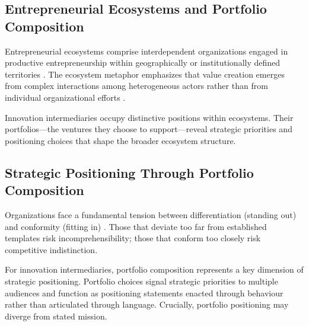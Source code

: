 \documentclass[../main.tex]{subfiles}
\begin{document}
\subsection{Entrepreneurial Ecosystems and Portfolio Composition}

Entrepreneurial ecosystems comprise interdependent organizations engaged in productive entrepreneurship within geographically or institutionally defined territories \cite{cohen2006sustainable,acs2017lineages}. The ecosystem metaphor emphasizes that value creation emerges from complex interactions among heterogeneous actors rather than from individual organizational efforts \cite{adner2017ecosystem}.

Innovation intermediaries occupy distinctive positions within ecosystems. Their portfolios---the ventures they choose to support---reveal strategic priorities and positioning choices that shape the broader ecosystem structure.

\subsection{Strategic Positioning Through Portfolio Composition}

Organizations face a fundamental tension between differentiation (standing out) and conformity (fitting in) \cite{porter1980competitive,deephouse1999same}. Those that deviate too far from established templates risk incomprehensibility; those that conform too closely risk competitive indistinction.

For innovation intermediaries, portfolio composition represents a key dimension of strategic positioning. Portfolio choices signal strategic priorities to multiple audiences and function as positioning statements enacted through behaviour rather than articulated through language. Crucially, portfolio positioning may diverge from stated mission.
\end{document}
